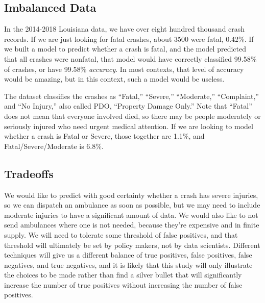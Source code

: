 \subsection{Imbalanced Data}

In the 2014-2018 Louisiana data, we have over eight hundred thousand crash records.  If we are just looking for fatal crashes, about 3500 were fatal, 0.42\%.  If we built a model to predict whether a crash is fatal, and the model predicted that all crashes were nonfatal, that model would have correctly classified 99.58\% of crashes, or have 99.58\% {\it accuracy}.  In most contexts, that level of accuracy would be amazing, but in this context, such a model would be useless.  

The dataset classifies the crashes as ``Fatal,'' ``Severe,'' ``Moderate,'' ``Complaint,'' and ``No Injury,'' also called PDO, ``Property Damage Only.''  Note that ``Fatal'' does not mean that everyone involved died, so there may be people moderately or seriously injured who need urgent medical attention.  If we are looking to model whether a crash is Fatal or Severe, those together are 1.1\%, and Fatal/Severe/Moderate is 6.8\%.  

\subsection{Tradeoffs}

We would like to predict with good certainty whether a crash has severe injuries, so we can dispatch an ambulance as soon as possible, but we may need to include moderate injuries to have a significant amount of data. We would also like to not send ambulances where one is not needed, because they're expensive and in finite supply.  We will need to tolerate some threshold of false positives, and that threshold will ultimately be set by policy makers, not by data scientists.  Different techniques will give us a different balance of true positives, false positives, false negatives, and true negatives, and it is likely that this study will only illustrate the choices to be made rather than find a silver bullet that will significantly increase the number of true positives without increasing the number of false positives.  


